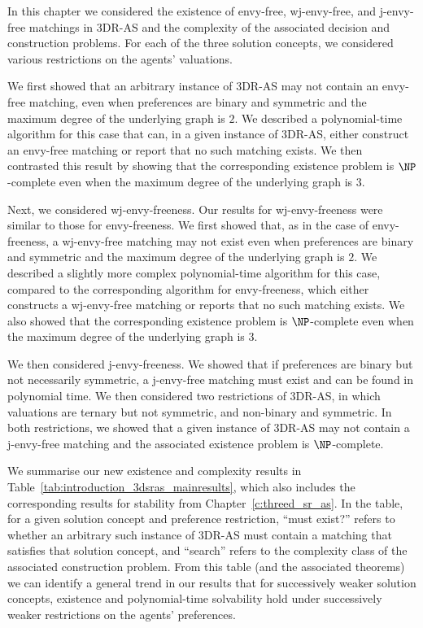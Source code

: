 In this chapter we considered the existence of envy-free, wj-envy-free, and j-envy-free matchings in 3DR-AS and the complexity of the associated decision and construction problems. For each of the three solution concepts, we considered various restrictions on the agents' valuations.

We first showed that an arbitrary instance of 3DR-AS may not contain an envy-free matching, even when preferences are binary and symmetric and the maximum degree of the underlying graph is $2$. We described a polynomial-time algorithm for this case that can, in a given instance of 3DR-AS, either construct an envy-free matching or report that no such matching exists. We then contrasted this result by showing that the corresponding existence problem is $\NP$-complete even when the maximum degree of the underlying graph is $3$.

Next, we considered wj-envy-freeness. Our results for wj-envy-freeness were similar to those for envy-freeness.  We first showed that, as in the case of envy-freeness, a wj-envy-free matching may not exist even when preferences are binary and symmetric and the maximum degree of the underlying graph is $2$. We described a slightly more complex polynomial-time algorithm for this case, compared to the corresponding algorithm for envy-freeness, which either constructs a wj-envy-free matching or reports that no such matching exists. We also showed that the corresponding existence problem is $\NP$-complete even when the maximum degree of the underlying graph is $3$. 

We then considered j-envy-freeness. We showed that if preferences are binary but not necessarily symmetric, a j-envy-free matching must exist and can be found in polynomial time. We then considered two restrictions of 3DR-AS, in which valuations are ternary but not symmetric, and non-binary and symmetric. In both restrictions, we showed that a given instance of 3DR-AS may not contain a j-envy-free matching and the associated existence problem is $\NP$-complete.

We summarise our new existence and complexity results in Table~\ref{tab:introduction_3dsras_mainresults}, which also includes the corresponding results for stability from Chapter~\ref{c:threed_sr_as}. In the table, for a given solution concept and preference restriction, ``must exist?'' refers to whether an arbitrary such instance of 3DR-AS must contain a matching that satisfies that solution concept, and ``search'' refers to the complexity class of the associated construction problem. From this table (and the associated theorems) we can identify a general trend in our results that for successively weaker solution concepts, existence and polynomial-time solvability hold under successively weaker restrictions on the agents' preferences.

